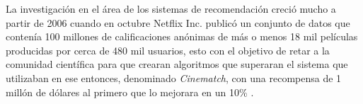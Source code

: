 La investigación en el área de los sistemas de recomendación creció mucho a partir de 2006 cuando en octubre Netflix Inc. publicó un conjunto de datos que contenía 100 millones de calificaciones anónimas de más o menos 18 mil películas producidas por cerca de 480 mil usuarios, esto con el objetivo de retar a la comunidad científica para que crearan algoritmos que superaran el sistema que utilizaban en ese entonces, denominado \textit{Cinematch}, con una recompensa de 1 millón de dólares al primero que lo mejorara en un 10\% \cite{bell2007lessons} \cite{bennett2007netflix} \cite{netflixprize}.


